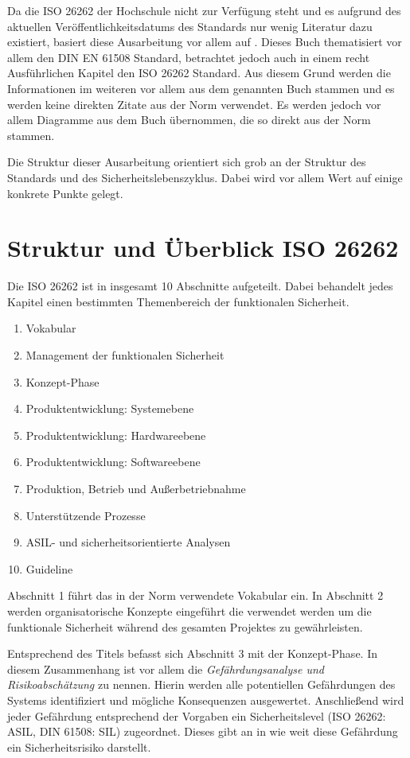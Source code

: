 \documentclass[a4paper,DIV=calc,ngerman]{scrartcl}
\begin{document}
Da die ISO 26262 der Hochschule nicht zur Verfügung steht und es aufgrund des aktuellen Veröffentlichkeitsdatums des Standards nur wenig Literatur dazu existiert, basiert diese Ausarbeitung vor allem auf \cite{1}. Dieses Buch thematisiert vor allem den DIN EN 61508 Standard, betrachtet jedoch auch in einem recht Ausführlichen Kapitel den ISO 26262 Standard. Aus diesem Grund werden die Informationen im weiteren vor allem aus dem genannten Buch stammen und es werden keine direkten Zitate aus der Norm verwendet. Es werden jedoch vor allem Diagramme aus dem Buch übernommen, die so direkt aus der Norm stammen.

Die Struktur dieser Ausarbeitung orientiert sich grob an der Struktur des Standards und des Sicherheitslebenszyklus. Dabei wird vor allem Wert auf einige konkrete Punkte gelegt.

\section{Struktur und Überblick ISO 26262}
\label{sec:Struktur}
Die ISO 26262 ist in insgesamt 10 Abschnitte aufgeteilt. Dabei behandelt jedes Kapitel einen bestimmten Themenbereich der funktionalen Sicherheit.

\begin{enumerate}
    \item Vokabular
    \item Management der funktionalen Sicherheit
    \item Konzept-Phase
    \item Produktentwicklung: Systemebene
    \item Produktentwicklung: Hardwareebene
    \item Produktentwicklung: Softwareebene
    \item Produktion, Betrieb und Außerbetriebnahme
    \item Unterstützende Prozesse
    \item ASIL- und sicherheitsorientierte Analysen
    \item Guideline
\end{enumerate}

Abschnitt 1 führt das in der Norm verwendete Vokabular ein. In Abschnitt 2 werden organisatorische Konzepte eingeführt die verwendet werden um die funktionale Sicherheit während des gesamten Projektes zu gewährleisten.

Entsprechend des Titels befasst sich Abschnitt 3 mit der Konzept-Phase. In diesem Zusammenhang ist vor allem die \emph{Gefährdungsanalyse und Risikoabschätzung} zu nennen. Hierin werden alle potentiellen Gefährdungen des Systems identifiziert und mögliche Konsequenzen ausgewertet. Anschließend wird jeder Gefährdung entsprechend der Vorgaben ein Sicherheitslevel (ISO 26262: ASIL, DIN 61508: SIL) zugeordnet. Dieses gibt an in wie weit diese Gefährdung ein Sicherheitsrisiko darstellt.
\end{document}
